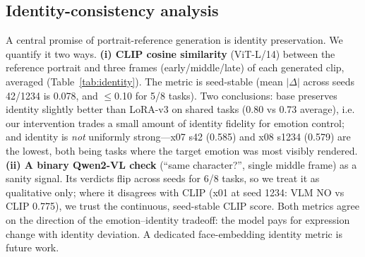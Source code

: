 \documentclass[10pt,twocolumn]{article}
\begin{document}
\subsection{Identity-consistency analysis}
A central promise of portrait-reference generation is identity preservation. We quantify it two
ways. \textbf{(i) CLIP cosine similarity} (ViT-L/14) between the reference portrait and three
frames (early/middle/late) of each generated clip, averaged (Table~\ref{tab:identity}). The metric
is seed-stable (mean $|\Delta|$ across seeds 42/1234 is 0.078, and $\le$0.10 for 5/8 tasks). Two
conclusions: base preserves identity slightly better than LoRA-v3 on shared tasks (0.80 vs 0.73
average), i.e. our intervention trades a small amount of identity fidelity for emotion control; and
identity is \emph{not} uniformly strong---x07 s42 (0.585) and x08 s1234 (0.579) are the lowest,
both being tasks where the target emotion was most visibly rendered. \textbf{(ii) A binary
Qwen2-VL check} (``same character?'', single middle frame) as a sanity signal. Its verdicts flip
across seeds for 6/8 tasks, so we treat it as qualitative only; where it disagrees with CLIP (x01
at seed 1234: VLM NO vs CLIP 0.775), we trust the continuous, seed-stable CLIP score. Both metrics
agree on the direction of the emotion--identity tradeoff: the model pays for expression change with
identity deviation. A dedicated face-embedding identity metric is future work.
\end{document}
